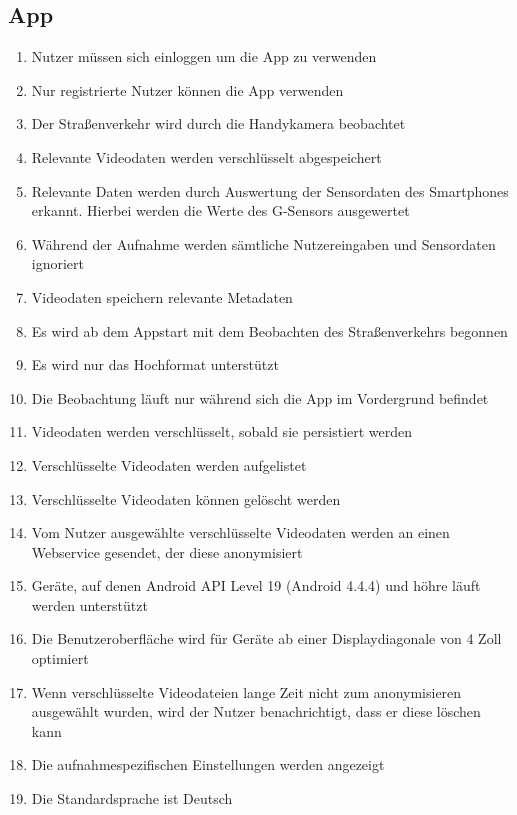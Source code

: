 \subsection{App}
	\begin{enumerate}
	\renewcommand{\labelenumi}{\textbf{\theenumi}}
	\renewcommand{\theenumi}{PK\arabic{enumi}0}
	\setcounter{enumi}{99}
	\item Nutzer müssen sich einloggen um die App zu verwenden
	\item Nur registrierte Nutzer können die App verwenden
	\item Der Straßenverkehr wird durch die Handykamera beobachtet 
	\item Relevante Videodaten werden verschlüsselt abgespeichert
	\item Relevante Daten werden durch Auswertung der Sensordaten des Smartphones erkannt. Hierbei werden die Werte des G-Sensors ausgewertet
	\item Während der Aufnahme werden sämtliche Nutzereingaben und Sensordaten ignoriert
	\item Videodaten speichern relevante Metadaten
	\item Es wird ab dem Appstart mit dem Beobachten des Straßenverkehrs begonnen
	\item Es wird nur das Hochformat unterstützt
	\item Die Beobachtung läuft nur während sich die App im Vordergrund befindet
	\item Videodaten werden verschlüsselt, sobald sie persistiert werden
	\item Verschlüsselte Videodaten werden aufgelistet
	\item Verschlüsselte Videodaten können gelöscht werden
	\item Vom Nutzer ausgewählte verschlüsselte Videodaten werden an einen Webservice gesendet, der diese anonymisiert
	\item Geräte, auf denen Android API Level 19 (Android 4.4.4) und höhre läuft werden unterstützt
	\item Die Benutzeroberfläche wird für Geräte ab einer Displaydiagonale von 4 Zoll optimiert
	\item Wenn verschlüsselte Videodateien lange Zeit nicht zum anonymisieren ausgewählt wurden, wird der Nutzer benachrichtigt, dass er diese löschen kann
	\item Die aufnahmespezifischen Einstellungen werden angezeigt
	\item Die Standardsprache ist Deutsch
	\end{enumerate}
